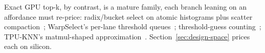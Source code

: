 Exact GPU top-k, by contrast, is a mature family, each branch leaning
on an affordance \bh must re-price: radix/bucket select on atomic
histograms plus scatter
compaction~\cite{alabi2012kselection,zhang2023paralleltopk,li2024radik};
WarpSelect's per-lane threshold
queues~\cite{johnson2019billion}; threshold-guess
counting~\cite{gvr2026}; TPU-KNN's matmul-shaped
approximation~\cite{chern2022tpuknn,twostage2025}.
Section~\ref{sec:design-space} prices each on silicon.
